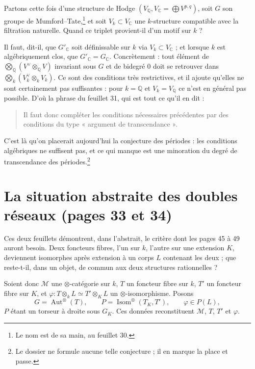 \documentclass[11pt,a4paper]{article}
\begin{document}
Partons cette fois d'une structure de Hodge $(V_{\mathbb{Q}}, V_{\mathbb{C}} =
\bigoplus V^{p,q})$, soit $G$ son groupe de Mumford--Tate,\footnote{Le nom est
de sa main, au feuillet 30.} et soit $V_{k} \subset V_{\mathbb{C}}$ une
$k$-structure compatible avec la filtration naturelle. Quand ce triplet
provient-il d'un motif sur $k$ ?

Il faut, dit-il, que $G'_{\mathbb{C}}$ soit définissable sur $k$ via
$V_{k} \subset V_{\mathbb{C}}$ ; et lorsque $k$ est algébriquement clos, que
$G'_{\mathbb{C}} = G_{\mathbb{C}}$. Concrètement : tout élément de
$\bigotimes_{\mathbb{Q}}(V^{\vee} \otimes_{\mathbb{Q}} V)$ invariant sous $G$ et
de bidegré $0$ doit se retrouver dans $\bigotimes_{k}(V^{\vee}_{k} \otimes_{k}
V_{k})$. Ce sont des conditions très restrictives, et il ajoute qu'elles ne sont
certainement pas suffisantes : pour $k = \mathbb{Q}$ et $V_{k} = V_{\mathbb{Q}}$
ce n'est en général pas possible. D'où la phrase du feuillet 31, qui est tout ce
qu'il en dit :

\begin{quote}
Il faut donc compléter les conditions nécessaires précédentes par des
conditions du type « argument de transcendance ».
\end{quote}

C'est là qu'on placerait aujourd'hui la conjecture des
périodes : les conditions algébriques ne suffisent pas, et ce qui manque est une
minoration du degré de transcendance des périodes.\footnote{Le dossier ne
formule aucune telle conjecture ; il en marque la place et passe.}

\section*{La situation abstraite des doubles réseaux (pages 33 et 34)}

Ces deux feuillets démontrent, dans l'abstrait, le critère dont les pages 45 à
49 auront besoin. Deux foncteurs fibres, l'un sur
$k$, l'autre sur une extension $K$, deviennent isomorphes après extension à un
corps $L$ contenant les deux ; que reste-t-il, dans un objet, de commun aux deux
structures rationnelles ?

Soient donc $\mathcal{M}$ une $\otimes$-catégorie sur $k$, $T$ un foncteur fibre
sur $k$, $T'$ un foncteur fibre sur $K$, et $\varphi : T \otimes_{k} L \simeq
T' \otimes_{K} L$ un $\otimes$-isomorphisme. Posons
\[
G = \operatorname{Aut}^{\otimes}(T) , \qquad
P = \operatorname{Isom}^{\otimes}(T_{K}, T') , \qquad
\varphi \in P(L) ,
\]
$P$ étant un torseur à droite sous $G_{K}$. Ces données reconstituent
$\mathcal{M}$, $T$, $T'$ et $\varphi$.
\end{document}
